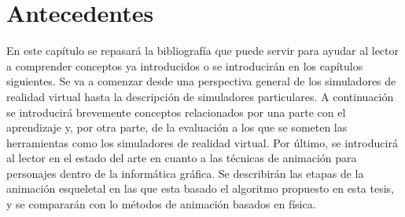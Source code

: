 \chapter{Antecedentes} 
\label{cap:related}

En este capítulo se repasará la bibliografía que puede servir para ayudar al lector a comprender conceptos ya introducidos o se introducirán en los capítulos siguientes. Se va a comenzar desde una perspectiva general de los simuladores de realidad virtual hasta la descripción de simuladores particulares. A continuación se introducirá brevemente conceptos relacionados por una parte con el aprendizaje y, por otra parte, de la evaluación a los que se someten las herramientas como los simuladores de realidad virtual. Por último, se introducirá al lector en el estado del arte en cuanto a las técnicas de animación para personajes dentro de la informática gráfica. Se describirán las etapas de la animación esqueletal en las que esta basado el algoritmo propuesto en esta tesis, y se compararán con lo métodos de animación basados en física.


